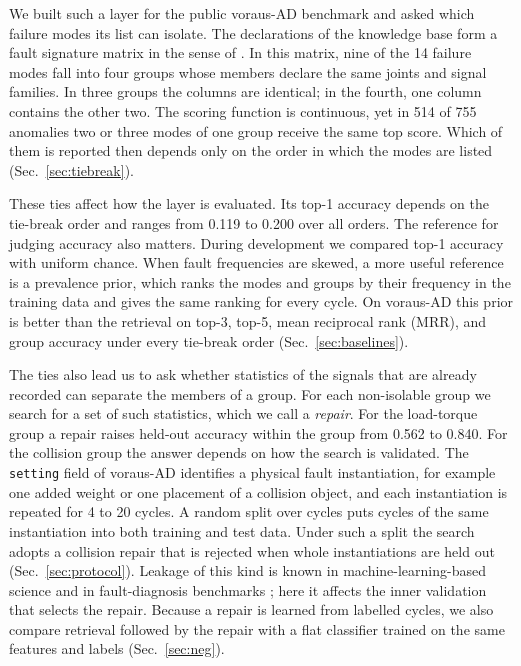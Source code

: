 \documentclass{ifacconf}
\begin{document}
We built such a layer for the public voraus-AD benchmark \citep{voraus} and
asked which failure modes its list can isolate. The declarations of the
knowledge base form a fault signature matrix in the sense of \citet{blanke}. In
this matrix, nine of the 14 failure modes fall into four groups whose members
declare the same joints and signal families. In three groups the columns are
identical; in the fourth, one column contains the other two. The scoring
function is continuous, yet in 514 of 755 anomalies two or three modes of one
group receive the same top score. Which of them is reported then depends only on
the order in which the modes are listed (Sec.~\ref{sec:tiebreak}).

These ties affect how the layer is evaluated. Its top-1 accuracy depends on the
tie-break order and ranges from 0.119 to 0.200 over all orders. The reference
for judging accuracy also matters. During development we compared top-1 accuracy
with uniform chance. When fault frequencies are skewed, a more useful reference
is a prevalence prior, which ranks the modes and groups
by their frequency in the training data and gives the same ranking for every
cycle. On voraus-AD this prior is better than the retrieval on top-3, top-5,
mean reciprocal rank (MRR), and group accuracy under every tie-break order
(Sec.~\ref{sec:baselines}).

The ties also lead us to ask whether statistics of the signals that are already
recorded can separate the members of a group. For each non-isolable group we
search for a set of such statistics, which we call a \emph{repair}. For the
load-torque group a repair raises held-out accuracy within the group from 0.562
to 0.840. For the collision group the answer depends on how the search is
validated. The \texttt{setting} field of voraus-AD
identifies a physical fault instantiation, for example one added weight or one
placement of a collision object, and each instantiation is repeated for 4 to 20
cycles. A random split over cycles puts cycles of the same instantiation into
both training and test data. Under such a split the search adopts a collision
repair that is rejected when whole instantiations are held out
(Sec.~\ref{sec:protocol}). Leakage of this kind is known
in machine-learning-based science \citep{kapoor} and in fault-diagnosis
benchmarks \citep{hendriks}; here it affects the inner validation that selects
the repair. Because a repair is learned from labelled cycles, we also compare
retrieval followed by the repair with a flat classifier trained on the same
features and labels (Sec.~\ref{sec:neg}).
\end{document}
